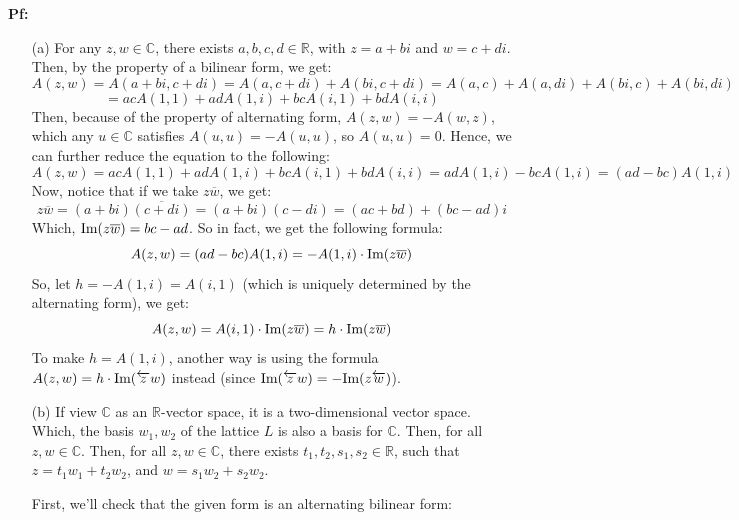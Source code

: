 \documentclass{article}
\begin{document}
\textbf{Pf:}
\begin{itemize}
    \item[(a)] For any $z,w\in \mathbb{C}$, there exists $a,b,c,d\in\mathbb{R}$, with $z=a+bi$ and $w=c+di$. Then, by the property of a bilinear form, we get:
    $$A(z,w)=A(a+bi,c+di) = A(a,c+di)+A(bi,c+di) = A(a,c)+A(a,di)+A(bi,c)+A(bi,di)$$
    $$ = acA(1,1)+adA(1,i)+bcA(i,1)+bdA(i,i)$$
    Then, because of the property of alternating form, $A(z,w)=-A(w,z)$, which any $u\in\mathbb{C}$ satisfies $A(u,u)=-A(u,u)$, so $A(u,u)=0$. Hence, we can further reduce the equation to the following:
    $$A(z,w)=acA(1,1)+adA(1,i)+bcA(i,1)+bdA(i,i) = adA(1,i)-bcA(1,i) = (ad-bc)A(1,i)$$
    Now, notice that if we take $z\overline{w}$, we get:
    $$z\overline{w} = (a+bi)\overline{(c+di)} = (a+bi)(c-di) = (ac+bd)+(bc-ad)i$$
    Which, $\textmd{Im}(z\overline{w}) = bc-ad$. So in fact, we get the following formula:
    $$A(z,w) = (ad-bc)A(1,i) = -A(1,i)\cdot \textmd{Im}(z\overline{w})$$
    So, let $h = -A(1,i)=A(i,1)$ (which is uniquely determined by the alternating form), we get:
    $$A(z,w)=A(i,1)\cdot\textmd{Im}(z\overline{w})=h\cdot\textmd{Im}(z\overline{w})$$
    To make $h=A(1,i)$, another way is using the formula $A(z,w)=h\cdot \textmd{Im}(\overleftarrow{z}w)$ instead (since $\textmd{Im}(\overleftarrow{z}w)=-\textmd{Im}(z\overleftarrow{w})$).

    \hfil

    \hfil

    \item[(b)] If view $\mathbb{C}$ as an $\mathbb{R}$-vector space, it is a two-dimensional vector space. Which, the basis $w_1,w_2$ of the lattice $L$ is also a basis for $\mathbb{C}$. Then, for all $z,w\in\mathbb{C}$. Then, for all $z,w\in\mathbb{C}$, there exists $t_1,t_2,s_1,s_2\in\mathbb{R}$, such that $z=t_1w_1+t_2w_2$, and $w=s_1w_2+s_2w_2$.
    
    \hfil
    
    First, we'll check that the given form is an alternating bilinear form: 
    

\end{itemize}
\end{document}
